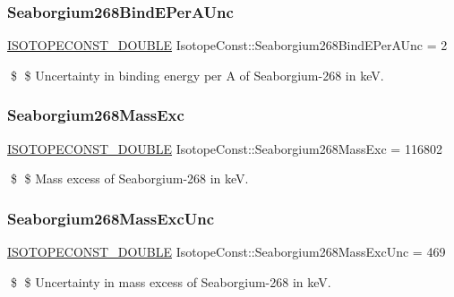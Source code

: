 \subsubsection{\texorpdfstring{Seaborgium268\+Bind\+E\+Per\+A\+Unc}{Seaborgium268BindEPerAUnc}}
{\footnotesize\ttfamily \mbox{\hyperlink{group___isotope_const-_macros_ga8f45a7272ce02c0b4c65c44636ed719a}{I\+S\+O\+T\+O\+P\+E\+C\+O\+N\+S\+T\+\_\+\+D\+O\+U\+B\+LE}} Isotope\+Const\+::\+Seaborgium268\+Bind\+E\+Per\+A\+Unc = 2}

\$ \$ Uncertainty in binding energy per A of Seaborgium-\/268 in keV. \mbox{\label{group___isotope_const-_seaborgium-_sg268_ga25024a4c25304ff6d0e2f1834c1b4da2}} 
\subsubsection{\texorpdfstring{Seaborgium268\+Mass\+Exc}{Seaborgium268MassExc}}
{\footnotesize\ttfamily \mbox{\hyperlink{group___isotope_const-_macros_ga8f45a7272ce02c0b4c65c44636ed719a}{I\+S\+O\+T\+O\+P\+E\+C\+O\+N\+S\+T\+\_\+\+D\+O\+U\+B\+LE}} Isotope\+Const\+::\+Seaborgium268\+Mass\+Exc = 116802}

\$ \$ Mass excess of Seaborgium-\/268 in keV. \mbox{\label{group___isotope_const-_seaborgium-_sg268_ga50fb149a5a317f79637cddeb62589cb5}} 
\subsubsection{\texorpdfstring{Seaborgium268\+Mass\+Exc\+Unc}{Seaborgium268MassExcUnc}}
{\footnotesize\ttfamily \mbox{\hyperlink{group___isotope_const-_macros_ga8f45a7272ce02c0b4c65c44636ed719a}{I\+S\+O\+T\+O\+P\+E\+C\+O\+N\+S\+T\+\_\+\+D\+O\+U\+B\+LE}} Isotope\+Const\+::\+Seaborgium268\+Mass\+Exc\+Unc = 469}

\$ \$ Uncertainty in mass excess of Seaborgium-\/268 in keV. \mbox{\label{group___isotope_const-_seaborgium-_sg268_gacb492fdfa624811cdf1c36d90ad318ab}} 
